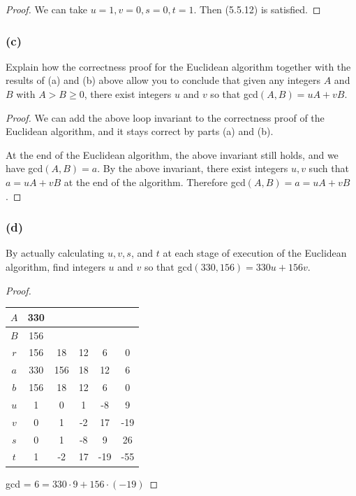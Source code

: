 \documentclass[14pt]{extarticle}
\begin{document}
\begin{proof}
We can take $u = 1, v = 0, s = 0, t = 1$. Then (5.5.12) is satisfied.
\end{proof}

\subsubsection{(c)}
Explain how the correctness proof for the Euclidean algorithm together with the results of (a) and (b) above 
allow you to conclude that given any integers $A$ and $B$ 
with $A > B \geq 0$, there exist integers $u$ and $v$ so 
that gcd$(A, B) = uA + vB$.

\begin{proof}
We can add the above loop invariant to the correctness proof of the Euclidean algorithm, and it stays correct by parts (a) and (b).

At the end of the Euclidean algorithm, the above invariant still holds, and we have gcd$(A,B) = a$. 
By the above invariant, there exist integers $u,v$ such that $a = uA + vB$ at the end of the algorithm.
Therefore gcd$(A,B) = a = uA + vB$.
\end{proof}

\subsubsection{(d)}
By actually calculating $u, v, s$, and $t$ at each stage of execution of the Euclidean algorithm, find integers $u$ and 
$v$ so that gcd$(330, 156) = 330u + 156v$.

\begin{proof}
\begin{tabular}{|c|c|c|c|c|c|}
\hline
$A$ &330&   &  &   &    \\
\hline
$B$ &156&   &  &   &    \\
\hline
$r$ &156& 18&12& 6 & 0  \\
\hline
$a$ &330&156&18& 12& 6  \\
\hline
$b$ &156& 18&12& 6 & 0  \\
\hline
$u$ & 1 & 0 & 1& -8& 9  \\
\hline
$v$ & 0 & 1 &-2& 17&-19 \\
\hline
$s$ & 0 & 1 &-8& 9 & 26 \\
\hline
$t$ & 1 & -2&17&-19&-55 \\
\hline
\end{tabular}
gcd = $6 = 330 \cdot 9 + 156 \cdot (-19)$
\end{proof}
\end{document}
